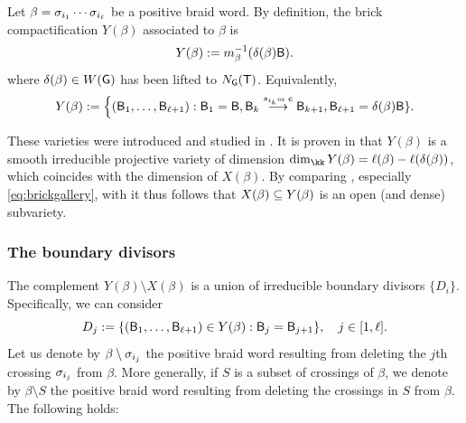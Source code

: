 \begin{definition}\label{def:brick}
Let $\beta=\sigma_{i_1}\cdots\sigma_{i_\ell}$ be a positive braid word. By definition, the brick compactification $Y(\beta)$ associated to $\beta$ is
\begin{equation}\label{eq:brickdef}
  Y(\beta):=m_\beta^{-1}(\delta(\beta)\mathsf{B}).
\end{equation}
where $\delta(\beta)\in W(\mathsf{G})$ has been lifted to $N_{\mathsf{G}}(\mathsf{T})$. Equivalently,
\begin{equation}\label{eq:brickgallery}
Y(\beta):=\Bigl\{(\borel_1,\ldots,\borel_{\ell+1}):
 \borel_1=\borel, \borel_{k} \buildrel s_{i_{k}}\mbox{\tiny or }e \over \longrightarrow \borel_{k+1},\borel_{\ell+1}=\delta(\beta)\borel\}.
\end{equation}
\sbs
\end{definition}

These varieties were introduced and studied in \cite{Escobar}. It is proven in \cite[Theorem 20]{Escobar} that $Y(\beta)$ is a smooth irreducible projective variety of dimension $\dim_\kk Y(\beta)=\ell(\beta)-\ell(\delta(\beta))$, which coincides with the dimension of $X(\beta)$. By comparing , especially \eqref{eq:brickgallery}, with  it thus follows that $X(\beta)\subseteq Y(\beta)$ is an open (and dense) subvariety.

\subsubsection{The boundary divisors}\label{sssec:dual_boundary_complex}
The complement $Y(\beta)\setminus X(\beta)$ is a union of irreducible boundary divisors $\{D_i\}$. Specifically, we can consider
\begin{equation}\label{eq:Djdef}
  D_j:=\{(\mathsf{B}_1,\ldots,\mathsf{B}_{\ell+1})\in Y(\beta):\mathsf{B}_{j}=\mathsf{B}_{j+1}\},\quad j\in[1,\ell].
\end{equation}
Let us denote by $\beta\setminus \sigma_{i_j}$ the positive braid word resulting from deleting the $j$th crossing $\sigma_{i_j}$ from $\beta$. More generally, if $S$ is a subset of crossings of $\beta$, we denote by $\beta\setminus S$ the positive braid word resulting from deleting the crossings in $S$ from $\beta$. The following holds:

